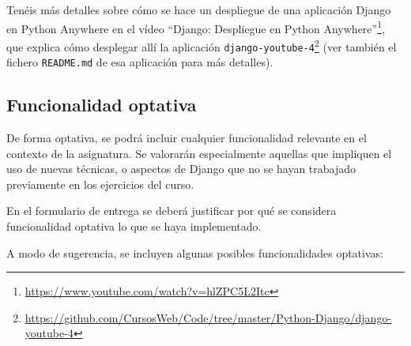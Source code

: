 Tenéis más detalles sobre cómo se hace un despliegue de una aplicación Django en Python Anywhere en el vídeo ``Django: Despliegue en Python Anywhere''\footnote{\url{https://www.youtube.com/watch?v=hlZPC5L2Itc}}, que explica cómo desplegar allí la aplicación \texttt{django-youtube-4}\footnote{\url{https://github.com/CursosWeb/Code/tree/master/Python-Django/django-youtube-4}} (ver también el fichero \texttt{README.md} de esa aplicación para más detalles).

\subsection{Funcionalidad optativa}

De forma optativa, se podrá incluir cualquier funcionalidad relevante en el contexto de la asignatura. Se valorarán especialmente aquellas que impliquen el uso de nuevas técnicas, o aspectos de Django que no se hayan trabajado previamente en los ejercicios del curso.

En el formulario de entrega se deberá justificar por qué se considera funcionalidad optativa lo que se haya implementado.

A modo de sugerencia, se incluyen algunas posibles funcionalidades optativas:

